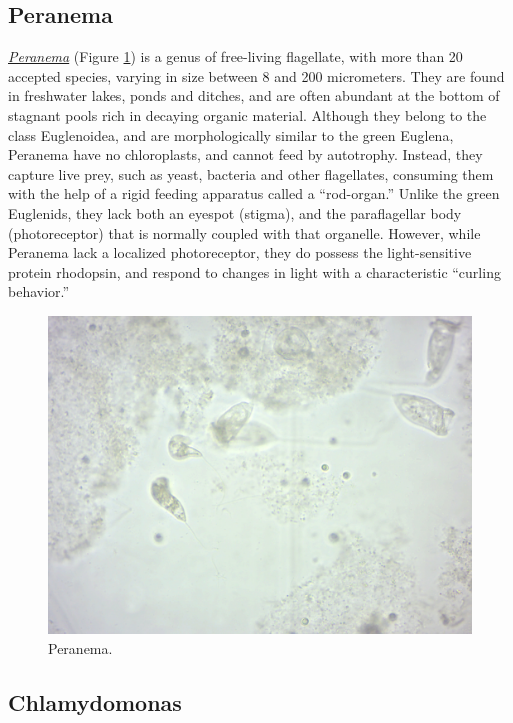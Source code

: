 \subsection{Peranema}\label{peranema}

\href{https://en.wikipedia.org/wiki/Peranema}{\emph{Peranema}} (Figure
\ref{fig:peranema}) is a genus of free-living flagellate, with more than
20 accepted species, varying in size between 8 and 200 micrometers. They
are found in freshwater lakes, ponds and ditches, and are often abundant
at the bottom of stagnant pools rich in decaying organic material.
Although they belong to the class Euglenoidea, and are morphologically
similar to the green Euglena, Peranema have no chloroplasts, and cannot
feed by autotrophy. Instead, they capture live prey, such as yeast,
bacteria and other flagellates, consuming them with the help of a rigid
feeding apparatus called a ``rod-organ.'' Unlike the green Euglenids,
they lack both an eyespot (stigma), and the paraflagellar body
(photoreceptor) that is normally coupled with that organelle. However,
while Peranema lack a localized photoreceptor, they do possess the
light-sensitive protein rhodopsin, and respond to changes in light with
a characteristic ``curling behavior.''

\begin{figure}

{\centering \includegraphics[width=0.7\linewidth]{./figures/protists/peranema}

}

\caption{Peranema.}\label{fig:peranema}
\end{figure}

\subsection{Chlamydomonas}\label{chlamydomonas}


